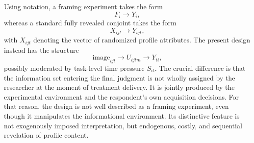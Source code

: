 \documentclass[11pt]{article}
\begin{document}
Using notation, a framing experiment takes the form
\[
F_i \longrightarrow Y_i,
\]
whereas a standard fully revealed conjoint takes the form
\[
X_{ijt} \longrightarrow Y_{ijt},
\]
with $X_{ijt}$ denoting the vector of randomized profile attributes. The present design instead has the structure
\[
\text{image}_{ijt} \longrightarrow U_{ijtm} \longrightarrow Y_{it},
\]
possibly moderated by task-level time pressure $S_{it}$. The crucial difference is that the information set entering the final judgment is not wholly assigned by the researcher at the moment of treatment delivery. It is jointly produced by the experimental environment and the respondent's own acquisition decisions. For that reason, the design is not well described as a framing experiment, even though it manipulates the informational environment. Its distinctive feature is not exogenously imposed interpretation, but endogenous, costly, and sequential revelation of profile content.


\newpage
\printbibliography
\end{document}
